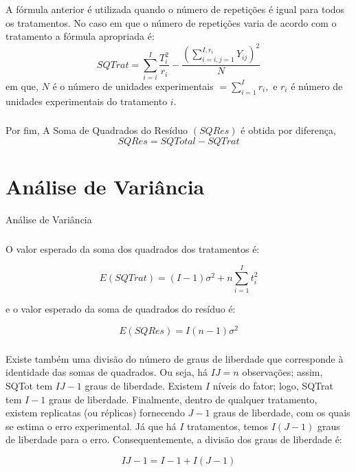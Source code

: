 \documentclass[14pt,aspectratio=1610]{beamer}
\begin{document}
\begin{frame}{}
\frametitle{}
\begin{block}{}
\justifying
A fórmula anterior é utilizada quando o número de repetições é igual para todos os
tratamentos. No caso em que o número de repetições varia de acordo com o tratamento a
fórmula apropriada é:
$$
SQTrat=
{\displaystyle \sum_{i=i}^{I}\dfrac{T_{i}^{2}}{r_{i}}-\dfrac{\left({\displaystyle \sum_{i=i,j=1}^{I,r_{i}}Y_{ij}}\right)^{2}}{N}}
$$
em que, $N$ é o número de unidades experimentais $={\displaystyle \sum_{i=1}^{I}r_{i}},$ e $r_{i}$ é número de unidades experimentais do tratamento $i.$
\end{block}
\end{frame}

\begin{frame}{}
\frametitle{}
\begin{block}{}
\justifying
Por fim, A Soma de Quadrados do Resíduo $(SQRes)$ é obtida por diferença,
$$SQRes=SQTotal-SQTrat$$
\end{block}
\end{frame}

\section{Análise de Variância}
\begin{frame}{Análise de Variância}
\frametitle{}
\begin{block}{}
\justifying
O valor esperado da soma dos quadrados dos tratamentos é:

$${\displaystyle E(SQTrat)=(I-1)\sigma^{2}+n\sum_{i=1}^{I}t_{i}^{2}}$$

e o valor esperado da soma de quadrados do resíduo é:

$$E(SQRes)=I(n-1)\sigma^{2}$$


\end{block}
\end{frame}

\begin{frame}{}
\frametitle{}
\begin{block}{}
\justifying
Existe também uma divisão do número de graus de liberdade que corresponde à identidade das somas de quadrados. Ou seja, há $IJ = n$ observações; assim, SQTot tem $IJ-1$ graus de liberdade. Existem $I$ níveis do fator; logo, SQTrat tem $I-1$ graus de liberdade. Finalmente, dentro de qualquer tratamento, existem replicatas (ou réplicas) fornecendo $J-1$ graus de liberdade, com os quais se estima o erro experimental. Já que há $I$ tratamentos, temos $I(J-1)$ graus de liberdade para o erro. Consequentemente, a divisão dos graus de liberdade é:

$$IJ-1=I-1+I(J-1)$$

\end{block}
\end{frame}
\end{document}
